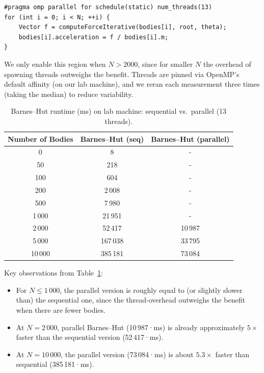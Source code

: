 \documentclass{article}
\begin{document}
\begin{verbatim}
#pragma omp parallel for schedule(static) num_threads(13)
for (int i = 0; i < N; ++i) {
    Vector f = computeForceIterative(bodies[i], root, theta);
    bodies[i].acceleration = f / bodies[i].m;
}
\end{verbatim}

We only enable this region when \(N > 2000\), since for smaller \(N\) the overhead of spawning threads outweighs the benefit. Threads are pinned via OpenMP’s default affinity (on our lab machine), and we reran each measurement three times (taking the median) to reduce variability.  


\begin{table}[H]
    \centering
    \begin{tabular}{|c|c|c|}
    \hline
    \textbf{Number of Bodies} & \textbf{Barnes–Hut (seq)} & \textbf{Barnes–Hut (parallel)} \\
    \hline
    0      &       8   &       -    \\ 
    50     &     218   &     -    \\ 
    100    &     604   &     -    \\ 
    200    &   2\,008  &   -   \\ 
    500    &   7\,980  &   -   \\ 
    1\,000 &  21\,951  &  -   \\ 
    2\,000 &  52\,417  &  10\,987   \\ 
    5\,000 & 167\,038  &  33\,795   \\ 
    10\,000& 385\,181  &  73\,084   \\ 
    \hline
    \end{tabular}
    \caption{Barnes–Hut runtime (ms) on lab machine: sequential vs.\ parallel (13 threads).}
    \label{tab:bh_seq_vs_par}
\end{table}

\noindent
Key observations from Table~\ref{tab:bh_seq_vs_par}:
\begin{itemize}
  \item For $N \le 1\,000$, the parallel version is roughly equal to (or slightly slower than) the sequential one, since the thread‐overhead outweighs the benefit when there are fewer bodies.
  \item At $N = 2\,000$, parallel Barnes–Hut (10\,987·ms) is already approximately $5\times$ faster than the sequential version (52\,417·ms).
  \item At $N = 10\,000$, the parallel version (73\,084·ms) is about $5.3\times$ faster than sequential (385\,181·ms).
\end{itemize}
\end{document}
